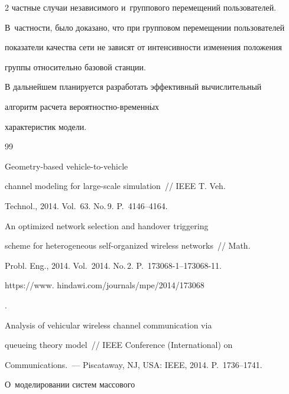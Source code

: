 \begin{multicols}{2}
частные случаи независимого и~группового перемещений пользователей. 

В~частности, было доказано, что при групповом перемещении пользователей 

показатели качества сети не зависят от интенсивности изменения положения 

группы относительно базовой станции. 

  

  В дальнейшем планируется разработать эффективный вычислительный 

алгоритм расчета ве\-ро\-ят\-но\-ст\-но-вре\-мен\-н$\acute{\mbox{ы}}$х 

характеристик модели.

  

{\small\frenchspacing

 {%


 \begin{thebibliography}{99}


 Geometry-based vehicle-to-vehicle 

channel modeling for large-scale simulation~// IEEE T. Veh. 

Technol., 2014. Vol.~63. No.\,9. P.~4146--4164.


 An optimized network selection and \mbox{handover} triggering 

scheme for heterogeneous self-organized wireless networks~// Math. 

Probl. Eng., 2014. Vol.~2014. No.\,2. P.~173068-1--173068-11. {\sf 

https://www. hindawi.com/journals/mpe/2014/173068}.


 Analysis of vehicular wireless channel communication via 

queueing theory model~// IEEE Conference (International) on 

Communications.~--- Piscataway, NJ, USA: IEEE, 2014. P.~1736--1741.


 О~моделировании систем массового 


\end{thebibliography}}}
\end{multicols}
